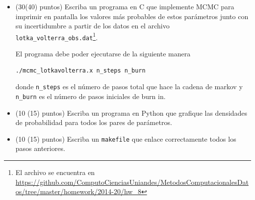 \documentclass[11pt,letterpaper]{exam}
\begin{document}
\begin{questions}
\begin{itemize}
\item (30(40) puntos) Escriba un programa en C que implemente MCMC para
  imprimir en pantalla los valores m\'as probables de estos par\'ametros junto
  con su incertidumbre a partir de los datos en el archivo
  \verb"lotka_volterra_obs.dat"\footnote{El archivo se encuentra en
    \url{https://github.com/ComputoCienciasUniandes/MetodosComputacionalesDatos/tree/master/homework/2014-20/hw_8}}. 

El programa debe poder ejecutarse de la siguiente manera 
\begin{verbatim}
./mcmc_lotkavolterra.x n_steps n_burn
\end{verbatim}
donde \verb"n_steps" es el n\'umero de pasos total que hace la cadena
de markov y \verb"n_burn" es el n\'umero de pasos iniciales de burn
in.

\item (10 (15) puntos) Escriba un programa en Python que grafique las
  densidades de probabilidad para todos los pares de par\'ametros.

\item (10 (15) puntos) Escriba un \verb"makefile" que enlace correctamente
  todos los pasos anteriores.

\end{itemize}


\end{questions}
\end{document}

